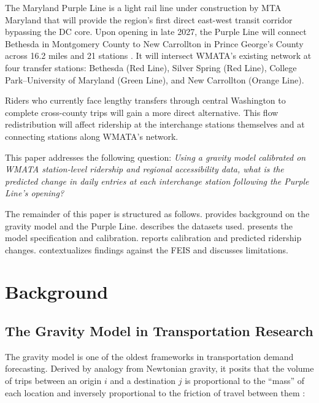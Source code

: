 \documentclass[11pt]{article}
\begin{document}
The Maryland Purple Line is a light rail line under construction by MTA
Maryland that will provide the region's first direct east-west transit
corridor bypassing the DC core. Upon opening in late 2027, the Purple Line
will connect Bethesda in Montgomery County to New Carrollton in Prince
George's County across 16.2 miles and 21 stations \citep{purplelinefeis}.
It will intersect WMATA's existing network at four transfer stations:
Bethesda (Red Line), Silver Spring (Red Line), College Park--University of
Maryland (Green Line), and New Carrollton (Orange Line).

Riders who currently face lengthy transfers through central Washington to
complete cross-county trips will gain a more direct alternative. This flow
redistribution will affect ridership at the interchange stations themselves
and at connecting stations along WMATA's network.

This paper addresses the following question: \textit{Using a gravity model
calibrated on WMATA station-level ridership and regional accessibility data,
what is the predicted change in daily entries at each interchange station
following the Purple Line's opening?}

The remainder of this paper is structured as follows. 
provides background on the gravity model and the Purple Line.
 describes the datasets used.  presents
the model specification and calibration.  reports
calibration and predicted ridership changes. 
contextualizes findings against the FEIS and discusses limitations.

\section{Background}
\label{sec:background}

\subsection{The Gravity Model in Transportation Research}

The gravity model is one of the oldest frameworks in transportation demand
forecasting. Derived by analogy from Newtonian gravity, it posits that the
volume of trips between an origin $i$ and a destination $j$ is proportional
to the ``mass'' of each location and inversely proportional to the friction
of travel between them \citep{zipf1946}:
\end{document}
